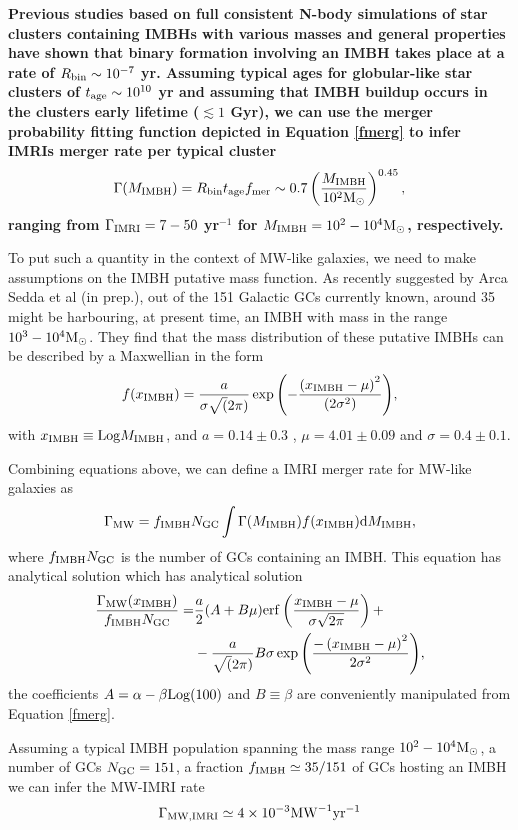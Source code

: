 \documentclass[useAMS,usenatbib]{mn2e}
\newcommand{\Log}{{\rm Log}}
\newcommand{\Ms}{{\rm M}_\odot}
\newcommand{\gc}{{\rm GC}}
\newcommand{\ibh}{{\rm IMBH}}
\begin{document}
{\bf Previous studies based on full consistent N-body simulations of star clusters containing IMBHs with various masses and general properties  \citep{konstantinidis13,haster16,leigh14, macleod16} have shown that binary formation involving an IMBH takes place at a rate of $R_{\rm bin} \sim 10^{-7}$ yr. Assuming typical ages for globular-like star clusters of $t_{\rm age}\sim 10^{10}$ yr and assuming that IMBH buildup occurs in the clusters early lifetime ($\lesssim 1$ Gyr), we can use the merger probability fitting function depicted in Equation \ref{fmerg} to infer IMRIs merger rate per typical cluster
\begin{equation}
    \Gamma(M_\ibh) = R_{\rm bin}t_{\rm age}f_{\rm mer} \sim 0.7\left(\frac{M_{\ibh}}{10^2\Ms}\right)^{0.45},
\end{equation}
ranging from $\Gamma_{\rm IMRI} = 7-50$ yr$^{-1}$ for $M_\ibh = 10^2-10^4\Ms$, respectively.

To put such a quantity in the context of MW-like galaxies, we need to make assumptions on the IMBH putative mass function. As recently suggested by Arca Sedda et al (in prep.), out of the 151 Galactic GCs currently known, around 35 might be harbouring, at present time, an IMBH with mass in the range $10^3-10^4\Ms$. They find that the mass distribution of these putative IMBHs can be described by a Maxwellian in the form 
\begin{equation}
    f(x_\ibh) = \frac{a}{\sigma\sqrt(2\pi)}\exp{\left(-\frac{\left(x_\ibh - \mu\right)^2}{ (2\sigma^2)}\right)},
\end{equation}
with $x_\ibh\equiv \Log M_\ibh$, and $a=0.14\pm0.3$ , $\mu = 4.01\pm0.09$ and $\sigma = 0.4\pm0.1 $.

Combining equations above, we can define a IMRI merger rate for MW-like galaxies as
\begin{equation}
    \Gamma_{\rm MW} = f_\ibh N_\gc \int \Gamma(M_\ibh) f(x_\ibh) {\rm d}M_\ibh,
\end{equation}
where $f_\ibh N_\gc$ is the number of GCs containing an IMBH. This equation has analytical solution
which has analytical solution
\begin{align}
 \frac{\Gamma_{\rm MW} (x_\ibh)}{f_\ibh N_\gc} =&   \frac{a}{2} (A + B\mu) {\rm erf}\left(\frac{x_\ibh-\mu}{\sigma\sqrt{2\pi}} \right) + \nonumber\\
                                & - \frac{a}{\sqrt(2\pi)}B \sigma \exp{\left(\frac{-\left(x_\ibh-\mu\right)^2}{2\sigma^2}\right)},
\end{align}
 the coefficients $A = \alpha -\beta \Log(100)$ and $B \equiv \beta$ are conveniently manipulated from Equation \ref{fmerg}.

Assuming a typical IMBH population spanning the mass range $10^2-10^4\Ms$, a number of GCs $N_\gc = 151$, a fraction $f_\ibh \simeq 35/151$ of GCs hosting an IMBH we can infer the MW-IMRI rate 
\begin{equation}
\Gamma_{\rm MW,IMRI} \simeq 4\times 10^{-3} {\rm MW}^{-1} {\rm yr}^{-1}
\end{equation}



}
\end{document}
